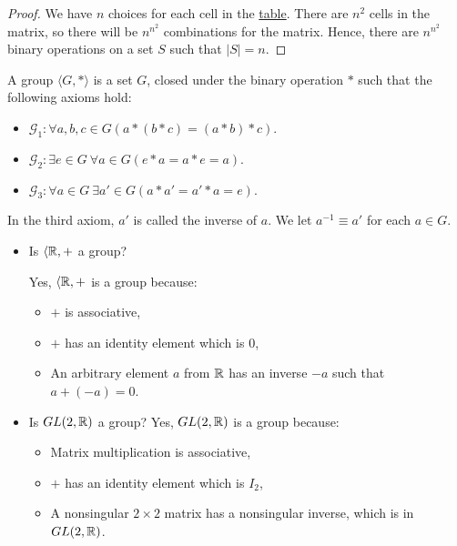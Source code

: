     \begin{proof}
        We have \(n\) choices for each cell in the \hyperref[exm:caytab]{table}. There are \(n^2\) cells in the matrix, so there will be \(n^{n^2}\) combinations for the matrix. Hence, there are \(n^{n^2}\) binary operations on a set \(S\) such that \(|S| = n\).
    \end{proof}

    \begin{dfn}[Group]
        A group \(\langle G, *\rangle\) is a set \(G\), closed under the binary operation \(*\) such that the following axioms hold:
        \begin{itemize}
            \item \(\mathcal{G}_1\!: \forall a,b,c\!\in\! G (a * (b * c) = (a * b) * c)\).
            \item \(\mathcal{G}_2\!: \exists e\!\in\! G\ \forall a\!\in\! G (e * a = a * e = a)\).
            \item \(\mathcal{G}_3\!: \forall a\!\in\! G\ \exists a'\!\in\! G (a * a' = a' * a = e)\).
        \end{itemize}

        In the third axiom, \(a'\) is called the inverse of \(a\). We let \(a^{-1} \equiv a'\) for each \(a\in G\).
    \end{dfn}

    \begin{example}
        \mbox{}

        \begin{itemize}
            \item Is \(\langle \mathbb{R}, +\) a group?

            Yes, \(\langle \mathbb{R}, +\) is a group because:
            \begin{itemize}
                \item \(+\) is associative,
                \item \(+\) has an identity element which is \(0\),
                \item An arbitrary element \(a\) from \(\mathbb{R}\) has an inverse \(-a\) such that \(a + (-a) = 0\).
            \end{itemize}

            \item Is \(GL(2, \mathbb{R})\) a group?
            Yes, \(GL(2, \mathbb{R})\) is a group because:
            \begin{itemize}
                \item Matrix multiplication is associative,
                \item \(+\) has an identity element which is \(I_2\),
                \item A nonsingular \(2 \times 2\) matrix has a nonsingular inverse, which is in \(GL(2, \mathbb{R})\).
            \end{itemize}
        \end{itemize}
    \end{example}
